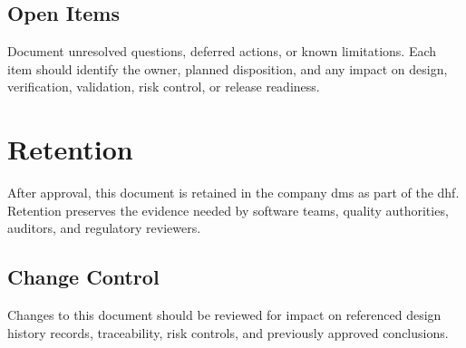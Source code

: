 \subsection{Open Items}
Document unresolved questions, deferred actions, or known limitations.  Each item
should identify the owner, planned disposition, and any impact on design,
verification, validation, risk control, or release readiness.

\section{Retention}
After approval, this document is retained in the \Gls{company} \Gls{dms} as part
of the \Gls{dhf}.  Retention preserves the evidence needed by software teams,
quality authorities, auditors, and regulatory reviewers.

\subsection{Change Control}
Changes to this document should be reviewed for impact on referenced design
history records, traceability, risk controls, and previously approved
conclusions.
